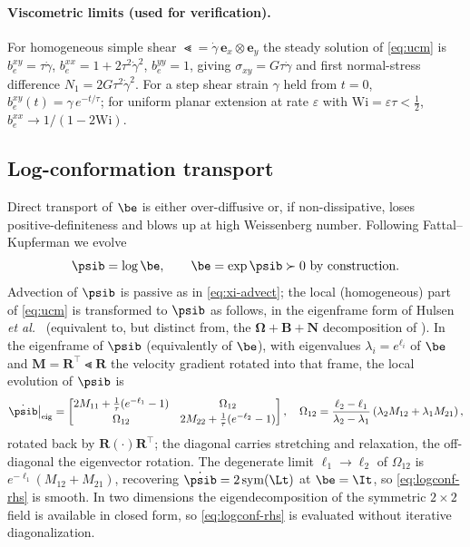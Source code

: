 \paragraph{Viscometric limits (used for verification).} For homogeneous simple shear
$\Lt=\dot\gamma\,\bm e_x\!\otimes\!\bm e_y$ the steady solution of \cref{eq:ucm} is
$b_e^{xy}=\tau\dot\gamma$, $b_e^{xx}=1+2\tau^2\dot\gamma^2$, $b_e^{yy}=1$, giving
$\sigma_{xy}=G\tau\dot\gamma$ and first normal-stress difference
$N_1=2G\tau^2\dot\gamma^2$. For a step shear strain $\gamma$ held from $t=0$,
$b_e^{xy}(t)=\gamma\,e^{-t/\tau}$; for uniform planar extension at rate $\varepsilon$
with $\mathrm{Wi}=\varepsilon\tau<\tfrac12$, $b_e^{xx}\to1/(1-2\mathrm{Wi})$.

\subsection{Log-conformation transport}
Direct transport of $\be$ is either over-diffusive or, if non-dissipative, loses
positive-definiteness and blows up at high Weissenberg number. Following
Fattal--Kupferman \cite{Fattal2004} we evolve
\begin{equation}
\psib=\log\be, \qquad \be=\exp\psib\succ0\ \text{by construction.}
\label{eq:psi}
\end{equation}
Advection of $\psib$ is passive as in \cref{eq:xi-advect}; the local (homogeneous) part
of \cref{eq:ucm} is transformed to $\psib$ as follows, in the eigenframe form of Hulsen
\emph{et al.}\ \cite{Hulsen2005} (equivalent to, but distinct from, the
$\bm\Omega+\bm B+\bm N$ decomposition of \cite{Fattal2004}). In the eigenframe of $\psib$
(equivalently of $\be$), with eigenvalues $\lambda_i=e^{\ell_i}$ of $\be$ and
$\bm M=\bm R^{\!\top}\Lt\bm R$ the velocity gradient rotated into that frame, the local
evolution of $\psib$ is
\begin{equation}
\dot{\psib}\big|_{\mathrm{eig}}
   = \begin{bmatrix} 2M_{11} + \tfrac1\tau(e^{-\ell_1}-1) & \Omega_{12}\\[2pt]
       \Omega_{12} & 2M_{22} + \tfrac1\tau(e^{-\ell_2}-1)\end{bmatrix},
\quad
\Omega_{12}=\frac{\ell_2-\ell_1}{\lambda_2-\lambda_1}\left(\lambda_2 M_{12}+\lambda_1 M_{21}\right),
\label{eq:logconf-rhs}
\end{equation}
rotated back by $\bm R(\cdot)\bm R^{\!\top}$; the diagonal carries stretching and
relaxation, the off-diagonal the eigenvector rotation. The degenerate limit
$\ell_1\!\to\!\ell_2$ of $\Omega_{12}$ is $e^{-\ell_1}(M_{12}+M_{21})$, recovering
$\dot{\psib}=2\,\mathrm{sym}(\Lt)$ at $\be=\It$, so \cref{eq:logconf-rhs} is smooth.
In two dimensions the eigendecomposition of the symmetric $2\times2$ field is available
in closed form, so \cref{eq:logconf-rhs} is evaluated without iterative diagonalization.

